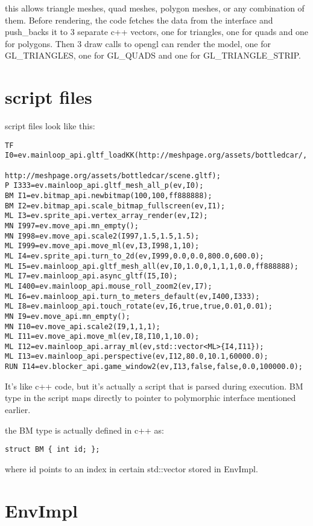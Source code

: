 \documentclass[11pt,twoside,a4paper]{article}
\begin{document}
this allows triangle meshes, quad meshes, polygon meshes, or any
combination of them. Before rendering, the code fetches the data from
the interface and push\_backs it to 3 separate c++ vectors, one for triangles, one for quads and one for polygons. Then 3 draw calls to opengl can render the model, one for GL\_TRIANGLES, one for GL\_QUADS and one for GL\_TRIANGLE\_STRIP.

\section{script files}

script files look like this:
\begin{verbatim}
TF I0=ev.mainloop_api.gltf_loadKK(http://meshpage.org/assets/bottledcar/,
                        http://meshpage.org/assets/bottledcar/scene.gltf);
P I333=ev.mainloop_api.gltf_mesh_all_p(ev,I0);
BM I1=ev.bitmap_api.newbitmap(100,100,ff888888);
BM I2=ev.bitmap_api.scale_bitmap_fullscreen(ev,I1);
ML I3=ev.sprite_api.vertex_array_render(ev,I2);
MN I997=ev.move_api.mn_empty();
MN I998=ev.move_api.scale2(I997,1.5,1.5,1.5);
ML I999=ev.move_api.move_ml(ev,I3,I998,1,10);
ML I4=ev.sprite_api.turn_to_2d(ev,I999,0.0,0.0,800.0,600.0);
ML I5=ev.mainloop_api.gltf_mesh_all(ev,I0,1.0,0,1,1,1,0.0,ff888888);
ML I7=ev.mainloop_api.async_gltf(I5,I0);
ML I400=ev.mainloop_api.mouse_roll_zoom2(ev,I7);
ML I6=ev.mainloop_api.turn_to_meters_default(ev,I400,I333);
ML I8=ev.mainloop_api.touch_rotate(ev,I6,true,true,0.01,0.01);
MN I9=ev.move_api.mn_empty();
MN I10=ev.move_api.scale2(I9,1,1,1);
ML I11=ev.move_api.move_ml(ev,I8,I10,1,10.0);
ML I12=ev.mainloop_api.array_ml(ev,std::vector<ML>{I4,I11});
ML I13=ev.mainloop_api.perspective(ev,I12,80.0,10.1,60000.0);
RUN I14=ev.blocker_api.game_window2(ev,I13,false,false,0.0,100000.0);
\end{verbatim}

It's like c++ code, but it's actually a script that is parsed during execution.
BM type in the script maps directly to 
pointer to polymorphic interface mentioned earlier.

the BM type is actually defined in c++ as:
\begin{verbatim}
struct BM { int id; };
\end{verbatim}
where id points to an index in certain std::vector stored in EnvImpl.

\section{EnvImpl}
\end{document}
